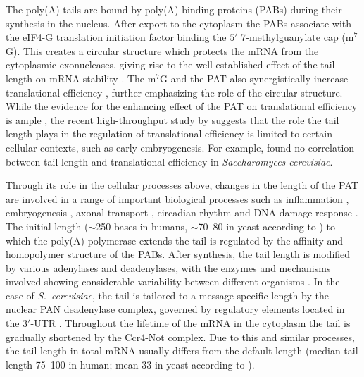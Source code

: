 \documentclass[10pt]{article}
\begin{document}
The poly(A) tails are bound by poly(A) binding proteins (PABs) during their synthesis in the nucleus. After export to the cytoplasm the PABs associate with the eIF4-G translation initiation factor binding the $5'$ 7-methylguanylate cap (m$^7$G). This creates a circular structure which protects the mRNA from the cytoplasmic exonucleases, giving rise to the well-established effect of the tail length on mRNA stability \cite{subtelny14,houseley06}. The m$^7$G and the PAT also synergistically increase translational efficiency \cite{gallie91}, further emphasizing the role of the circular structure. While the evidence for the enhancing effect of the PAT on translational efficiency is ample \cite{preiss98,lackner07}, the recent high-throughput study by \cite{subtelny14} suggests that the role the tail length plays in the regulation of translational efficiency is limited to certain cellular contexts, such as early embryogenesis. For example, \cite{subtelny14} found no correlation between tail length and translational efficiency in \textit{Saccharomyces cerevisiae}.

Through its role in the cellular processes above, changes in the length of the PAT are involved in a range of important biological processes such as inflammation \cite{weill12}, embryogenesis \cite{weill12,subtelny14}, axonal transport \cite{weill12}, circadian rhythm \cite{gotic12} and DNA damage response \cite{traven05}. The initial length ($\sim$250 bases in humans, $\sim$70--80 in yeast according to \cite{eckmann11}) to which the poly(A) polymerase extends the tail is regulated by the affinity and homopolymer structure of the PABs. After synthesis, the tail length is modified by various adenylases and deadenylases, with the enzymes and mechanisms involved showing considerable variability between different organisms \cite{brown98,eckmann11}. In the case of \textit{S.~cerevisiae}, the tail is tailored to a message-specific length by the nuclear PAN deadenylase complex, governed by regulatory elements located in the $3'$-UTR \cite{brown98,beilharz07}. Throughout the lifetime of the mRNA in the cytoplasm the tail is gradually shortened by the Ccr4-Not complex. Due to this and similar processes, the tail length in total mRNA usually differs from the default length (median tail length 75--100 in human; mean 33 in yeast according to \cite{subtelny14}).
\end{document}
